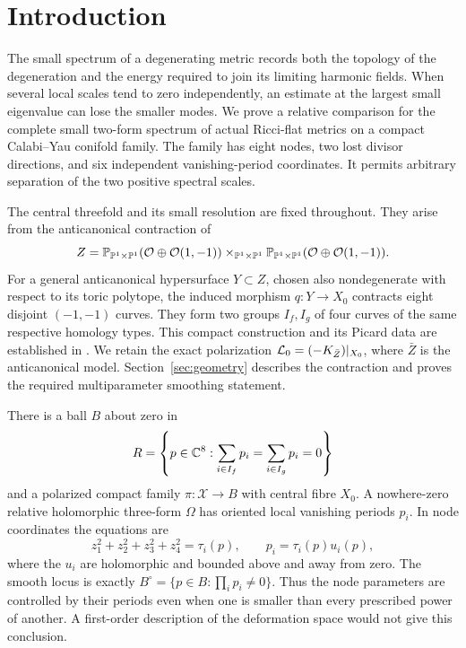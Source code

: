 \section{Introduction}\label{sec:introduction}

The small spectrum of a degenerating metric records both the topology of
the degeneration and the energy required to join its limiting harmonic
fields. When several local scales tend to zero independently, an estimate
at the largest small eigenvalue can lose the smaller modes. We prove a
relative comparison for the complete small two-form spectrum of actual
Ricci-flat metrics on a compact Calabi--Yau conifold family. The family
has eight nodes, two lost divisor directions, and six independent
vanishing-period coordinates. It permits arbitrary separation of the
two positive spectral scales.

The central threefold and its small resolution are fixed throughout.
They arise from the anticanonical contraction of
\begin{equation}\label{eq:ambient-intro}
 Z=\mathbb P_{\mathbb P^1\times\mathbb P^1}(\mathcal O\oplus\mathcal O(1,-1))
       \times_{\mathbb P^1\times\mathbb P^1}
       \mathbb P_{\mathbb P^1\times\mathbb P^1}(\mathcal O\oplus\mathcal O(1,-1)).
\end{equation}
For a general anticanonical hypersurface $Y\subset Z$, chosen also
nondegenerate with respect to its toric polytope, the induced morphism
$q:Y\to X_0$ contracts eight disjoint $(-1,-1)$ curves. They form two
groups $I_f,I_g$ of four curves of the same respective homology types.
This compact construction and its Picard data are established in
\cite[Appendix~A]{wuebben-chambers}. We retain the exact polarization
$\mathcal L_0=(-K_{\bar Z})|_{X_0}$, where $\bar Z$ is the anticanonical
model. Section~\ref{sec:geometry} describes the contraction and proves
the required multiparameter smoothing statement.

There is a ball $B$ about zero in
\begin{equation}\label{eq:period-base-intro}
 R=\left\{p\in\mathbb C^8:
       \sum_{i\in I_f}p_i=\sum_{i\in I_g}p_i=0\right\}
\end{equation}
and a polarized compact family $\pi:\mathcal X\to B$ with central
fibre $X_0$. A nowhere-zero relative holomorphic three-form $\Omega$
has oriented local vanishing periods $p_i$. In node coordinates the
equations are
\begin{equation}\label{eq:node-unit-intro}
 z_1^2+z_2^2+z_3^2+z_4^2=\tau_i(p),\qquad
 p_i=\tau_i(p)u_i(p),
\end{equation}
where the $u_i$ are holomorphic and bounded above and away from zero.
The smooth locus is exactly $B^\circ=\{p\in B:\prod_i p_i\ne0\}$.
Thus the node parameters are controlled by their periods even when one
is smaller than every prescribed power of another. A first-order
description of the deformation space would not give this conclusion.

